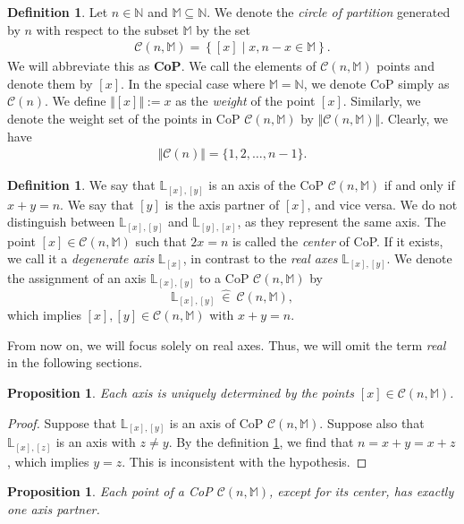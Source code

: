 \documentclass[12pt]{amsart}
\newtheorem{proposition}[theorem]{Proposition}
\theoremstyle{definition}
\newtheorem{definition}[theorem]{Definition}
\theoremstyle{remark}
\numberwithin{equation}{section}
\newcommand{\inn}{~ \hat{\in}~ }
\newcommand{\C}{\mathcal{C}}
\newcommand{\M}{\mathbb{M}}
\newcommand{\N}{\mathbb{N}}
\newcommand{\LL}{\mathbb{L}}
\begin{document}
\begin{definition}\label{major}
Let $n\in \N$ and $\M\subseteq \N$. We denote the \emph{circle of partition} generated by $n$ with respect to the subset $\M$ by the set
\begin{align}
\C(n,\M)=\left\{[x]\mid x,n-x\in \M\right\}.\nonumber
\end{align}
We will abbreviate this as \textbf{CoP}. We call the elements of $\C(n,\M)$ points and denote them by $[x]$. In the special case where $\M = \N$, we denote CoP simply as $\C(n)$. We define $\Vert[x]\Vert := x$ as the \emph{weight} of the point $[x]$. Similarly, we denote the weight set of the points in CoP $\C(n,\M)$ by $\Vert\C(n,\M)\Vert$. Clearly, we have
\begin{align}\label{E_C(n)}
\Vert\C(n)\Vert=\lbrace 1,2,\ldots, n-1\rbrace.
\end{align}
\end{definition}
\bigskip

\begin{definition}\label{axis}
We say that $\LL_{[x],[y]}$ is an axis of the CoP $\C(n,\M)$ if and only if $x+y=n$. We say that $[y]$ is the axis partner of $[x]$, and vice versa. We do not distinguish between $\LL_{[x],[y]}$ and $\LL_{[y],[x]}$, as they represent the same axis. The point $[x]\in \C(n,\M)$ such that $2x=n$ is called the \emph{center} of CoP. If it exists, we call it a \emph{degenerate axis} $\LL_{[x]}$, in contrast to the \emph{real axes} $\LL_{[x],[y]}$. We denote the assignment of an axis $\LL_{[x],[y]}$ to a CoP $\C(n,\M)$ by
\[
\LL_{[x],[y]} \inn \C(n,\M),
\]
which implies $[x], [y] \in \C(n,\M)$ with $x+y=n$.
\end{definition}
\bigskip

From now on, we will focus solely on real axes. Thus, we will omit the term \emph{real} in the following sections.

\begin{proposition}\label{unique}
Each axis is uniquely determined by the points $[x]\in \C(n,\M)$.
\end{proposition}

\begin{proof}
Suppose that $\LL_{[x],[y]}$ is an axis of CoP $\C(n,\M)$. Suppose also that $\LL_{[x],[z]}$ is an axis with $z\neq y$. By the definition \ref{axis}, we find that $n=x+y=x+z$, which implies $y=z$. This is inconsistent with the hypothesis.
\end{proof}

\begin{proposition}
Each point of a CoP $\C(n,\M)$, except for its center, has exactly one axis partner.
\end{proposition}
\end{document}
